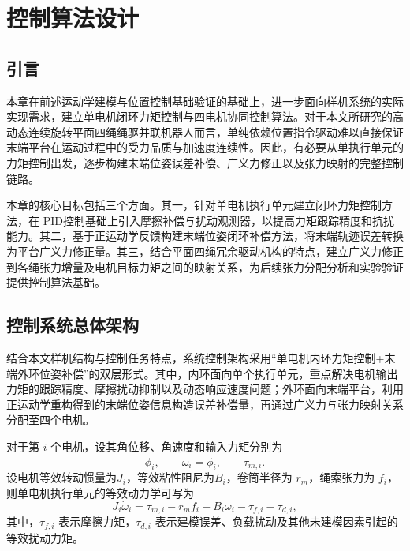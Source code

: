 
\chapter{控制算法设计}

\section{引言}

本章在前述运动学建模与位置控制基础验证的基础上，进一步面向样机系统的实际实现需求，建立单电机闭环力矩控制与四电机协同控制算法。对于本文所研究的高动态连续旋转平面四绳绳驱并联机器人而言，单纯依赖位置指令驱动难以直接保证末端平台在运动过程中的受力品质与加速度连续性。因此，有必要从单执行单元的力矩控制出发，逐步构建末端位姿误差补偿、广义力修正以及张力映射的完整控制链路。

本章的核心目标包括三个方面。其一，针对单电机执行单元建立闭环力矩控制方法，在 PID控制基础上引入摩擦补偿与扰动观测器，以提高力矩跟踪精度和抗扰能力。其二，基于正运动学反馈构建末端位姿闭环补偿方法，将末端轨迹误差转换为平台广义力修正量。其三，结合平面四绳冗余驱动机构的特点，建立广义力修正到各绳张力增量及电机目标力矩之间的映射关系，为后续张力分配分析和实验验证提供控制算法基础。

\section{控制系统总体架构}

结合本文样机结构与控制任务特点，系统控制架构采用“单电机内环力矩控制+末端外环位姿补偿”的双层形式。其中，内环面向单个执行单元，重点解决电机输出力矩的跟踪精度、摩擦扰动抑制以及动态响应速度问题；外环面向末端平台，利用正运动学重构得到的末端位姿信息构造误差补偿量，再通过广义力与张力映射关系分配至四个电机。

对于第 $i$ 个电机，设其角位移、角速度和输入力矩分别为
\begin{equation}
  \phi_i,\qquad \omega_i=\dot{\phi}_i,\qquad \tau_{m,i}.
\end{equation}
设电机等效转动惯量为$J_i$，等效粘性阻尼为$B_i$，卷筒半径为 $r_m$，绳索张力为 $f_i$，则单电机执行单元的等效动力学可写为
\begin{equation}
  J_i\dot{\omega}_i = \tau_{m,i} - r_m f_i - B_i\omega_i - \tau_{f,i} - \tau_{d,i}, \label{eq:ch4-motor-dyn}
\end{equation}
其中，$\tau_{f,i}$ 表示摩擦力矩，$\tau_{d,i}$ 表示建模误差、负载扰动及其他未建模因素引起的等效扰动力矩。

